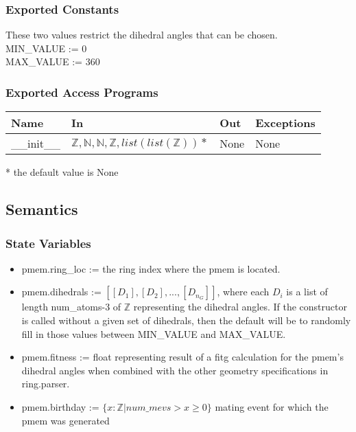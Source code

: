\documentclass[12pt, titlepage]{article}
\begin{document}
\subsubsection{Exported Constants}

These two values restrict the dihedral angles that can be chosen.\\
\indent MIN\_VALUE := 0\\
\indent MAX\_VALUE := 360

\subsubsection{Exported Access Programs}

\begin{center}
	\begin{tabular}{p{2cm} p{4cm} p{4cm} p{2cm}}
		\hline
		\textbf{Name} & \textbf{In} & \textbf{Out} & \textbf{Exceptions} \\
		\hline
		\_\_init\_\_ & $\mathbb{Z}, \mathbb{N}, \mathbb{N}, \mathbb{Z}, 
		list(list(\mathbb{Z}))*$ & None 
		& None \\
		\hline
	\end{tabular}
\end{center}
* the default value is None

\subsection{Semantics}

\subsubsection{State Variables}

\begin{itemize}
	\item pmem.ring\_loc := the ring index where the pmem is located.
	\item pmem.dihedrals := $[[D_1], [D_2], ..., [D_{n_G}]]$, where each $D_i$ 
	is a list of length num\_atoms-3 of $\mathbb{Z}$ representing the dihedral 
	angles. If the constructor is called without a given set of dihedrals, then 
	the default will be to randomly fill in those values between MIN\_VALUE and 
	MAX\_VALUE.
	\item pmem.fitness := float representing result of a fitg calculation for 
	the pmem's dihedral angles when combined with the other geometry 
	specifications in ring.parser.
	\item pmem.birthday := $\{x:\mathbb{Z} | num\_mevs > x \geq 0\}$ mating 
	event 
	for which the pmem was generated
\end{itemize}
\end{document}
